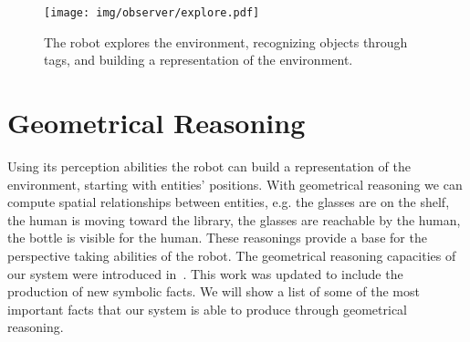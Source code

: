  \begin{figure}[ht!]
	\centering
	\texttt{[image: img/observer/explore.pdf]}
	\caption[The robot builds a representation of the environment]{The robot explores the environment, recognizing objects through tags, and building a representation of the environment.}
	\label{fig:belief_management-explore}
\end{figure}

\section{Geometrical Reasoning}
\label{sec:belief_management-geometrical_reasoning}

Using its perception abilities the robot can build a representation of the environment, starting with entities' positions. With geometrical reasoning we can compute spatial relationships between entities, e.g. the glasses are on the shelf, the human is moving toward the library, the glasses are reachable by the human, the bottle is visible for the human. These reasonings provide a base for the perspective taking abilities of the robot.  The geometrical reasoning capacities of our system were introduced in~\cite{Sisbot2011}. This work was updated to include the production of new symbolic facts. We will show a list of some of the most important facts that our system is able to produce through geometrical reasoning.

